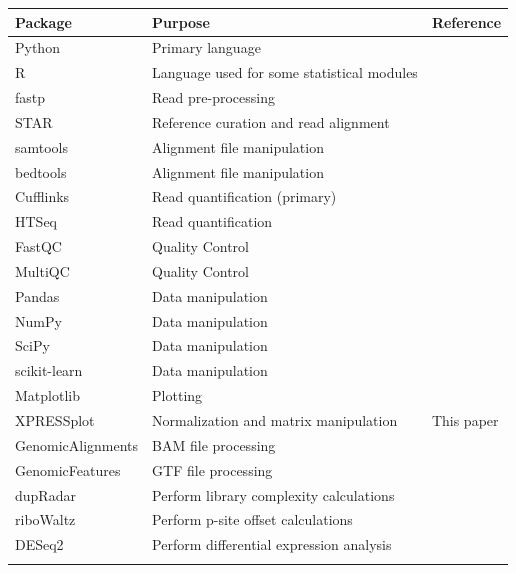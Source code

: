\documentclass[10pt, oneside]{article}
\begin{document}
\begin{table}[!]
    \centering
{}
\begin{tabular}{p{3cm}p{7.5cm}p{2.4cm}}
 \textbf{Package} & \textbf{Purpose} & \textbf{Reference} \\
 \hline
 Python & Primary language & \\
 \hline
 R & Language used for some statistical modules & \\
 \hline
 fastp & Read pre-processing & \cite{fastp} \\
 \hline
 STAR & Reference curation and read alignment & \cite{star} \\
 \hline
 samtools & Alignment file manipulation & \cite{samtools} \\
 \hline
 bedtools & Alignment file manipulation & \cite{bedtools} \\
 \hline
 Cufflinks & Read quantification (primary) & \cite{cufflinks} \\
 \hline
 HTSeq & Read quantification & \cite{htseq} \\
 \hline
 FastQC & Quality Control & \cite{fastqc} \\
 \hline
 MultiQC & Quality Control & \cite{multiqc} \\
 \hline
 Pandas & Data manipulation & \cite{pandas} \\
 \hline
 NumPy & Data manipulation & \cite{numpy1, numpy2} \\
 \hline
 SciPy & Data manipulation & \cite{scipy} \\
 \hline
 scikit-learn & Data manipulation & \cite{sklearn} \\
 \hline
 Matplotlib & Plotting & \cite{matplotlib} \\
 \hline
 XPRESSplot & Normalization and matrix manipulation & This paper \\
 \hline
 GenomicAlignments & BAM file processing & \cite{genomicalign} \\
 \hline
 GenomicFeatures & GTF file processing & \cite{genomicalign} \\
 \hline
 dupRadar & Perform library complexity calculations & \cite{dupradar} \\
 \hline
 riboWaltz & Perform p-site offset calculations & \cite{ribowaltz} \\
 \hline
 DESeq2 & Perform differential expression analysis & \cite{deseq2} \\
 \label{Tab:software_pipe}
\end{tabular}
\end{table}
\end{document}
